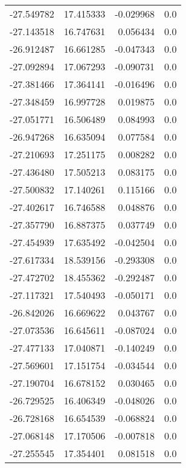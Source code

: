 \begin{tabular}{rrrr}
      -27.549782 &        17.415333 &   -0.029968 &   0.0 \\
      -27.143518 &        16.747631 &    0.056434 &   0.0 \\
      -26.912487 &        16.661285 &   -0.047343 &   0.0 \\
      -27.092894 &        17.067293 &   -0.090731 &   0.0 \\
      -27.381466 &        17.364141 &   -0.016496 &   0.0 \\
      -27.348459 &        16.997728 &    0.019875 &   0.0 \\
      -27.051771 &        16.506489 &    0.084993 &   0.0 \\
      -26.947268 &        16.635094 &    0.077584 &   0.0 \\
      -27.210693 &        17.251175 &    0.008282 &   0.0 \\
      -27.436480 &        17.505213 &    0.083175 &   0.0 \\
      -27.500832 &        17.140261 &    0.115166 &   0.0 \\
      -27.402617 &        16.746588 &    0.048876 &   0.0 \\
      -27.357790 &        16.887375 &    0.037749 &   0.0 \\
      -27.454939 &        17.635492 &   -0.042504 &   0.0 \\
      -27.617334 &        18.539156 &   -0.293308 &   0.0 \\
      -27.472702 &        18.455362 &   -0.292487 &   0.0 \\
      -27.117321 &        17.540493 &   -0.050171 &   0.0 \\
      -26.842026 &        16.669622 &    0.043767 &   0.0 \\
      -27.073536 &        16.645611 &   -0.087024 &   0.0 \\
      -27.477133 &        17.040871 &   -0.140249 &   0.0 \\
      -27.569601 &        17.151754 &   -0.034544 &   0.0 \\
      -27.190704 &        16.678152 &    0.030465 &   0.0 \\
      -26.729525 &        16.406349 &   -0.048026 &   0.0 \\
      -26.728168 &        16.654539 &   -0.068824 &   0.0 \\
      -27.068148 &        17.170506 &   -0.007818 &   0.0 \\
      -27.255545 &        17.354401 &    0.081518 &   0.0 \\

\end{tabular}
